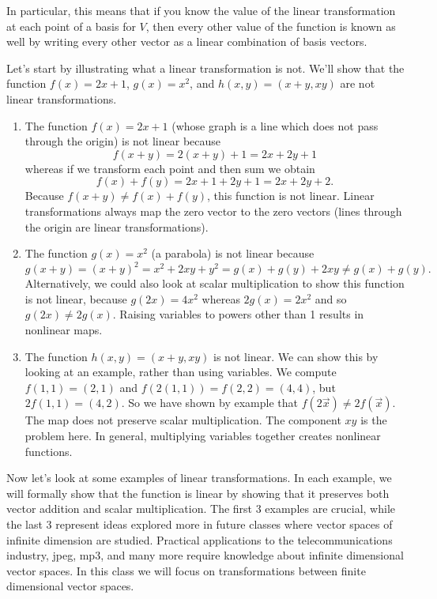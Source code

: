  In particular, this means that if you know the value of the linear transformation at each point of a basis for $V$, then every other value of the function is known as well by writing every other vector as a linear combination of basis vectors. 
\begin{example}
Let's start by illustrating what a linear transformation is not. We'll show that the function $f(x) = 2x+1$, $g(x)=x^2$, and $h(x,y)=(x+y,xy)$ are not linear transformations.
\begin{enumerate}
	\item The function $f(x)=2x+1$ (whose graph is a line which does not pass through the origin) is not linear because
	 $$f(x+y)=2(x+y)+1 = 2x+2y+1$$ whereas if we transform each point and then sum we obtain $$f(x)+f(y)=2x+1+2y+1 = 2x+2y+2.$$
	 Because $f(x+y)\neq f(x)+f(y)$, this function is not linear. 
	 Linear transformations always map the zero vector to the zero vectors (lines through the origin are linear transformations).
	\item The function $g(x)=x^2$ (a parabola) is not linear because $$g(x+y)=(x+y)^2 = x^2+2xy+y^2 = g(x)+g(y)+2xy \neq g(x)+g(y).$$ 
	Alternatively, we could also look at scalar multiplication to show this function is not linear, because $g(2x) = 4x^2$ whereas $2g(x) = 2x^2$ and so $g(2x)\neq 2g(x)$. 
	Raising variables to powers other than 1 results in nonlinear maps.
	\item The function $h(x,y)=(x+y,xy)$ is not linear. We can show this by looking at an example, rather than using variables. 
	We compute $f(1,1)=(2,1)$ and $f(2(1,1)) = f(2,2)=(4,4)$, but $2f(1,1) = (4,2)$. 
	So we have shown by example that $f(2\vec x)\neq 2f(\vec x)$. 
	The map does not preserve scalar multiplication. 
	The component $xy$ is the problem here. In general, multiplying variables together creates nonlinear functions.  
\end{enumerate}
\end{example}

Now let's look at some examples of linear transformations. 
In each example, we will formally show that the function is linear by showing that it preserves both vector addition and scalar multiplication.  
The first 3 examples are crucial, while the last 3 represent ideas explored more in future classes where vector spaces of infinite dimension are studied. 
Practical applications to the telecommunications industry, jpeg, mp3, and many more require knowledge about infinite dimensional vector spaces.  
In this class we will focus on transformations between finite dimensional vector spaces.

